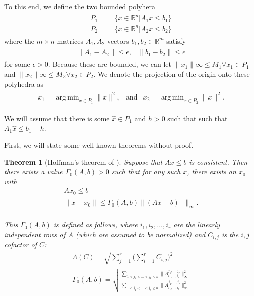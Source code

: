 \documentclass{article}
\newtheorem{theorem}{Theorem}[section]
\theoremstyle{case}
\newcommand{\Rn}{\mathbb R^n}
\newcommand{\Rm}{\mathbb R^m}
\DeclareMathOperator*{\argmin}{arg\,min}
\begin{document}
To this end, we define the two bounded polyhera
\begin{align*}
\begin{array}{ccc}
P_1 &=& \{ x \in \Rn | A_1x\le b_1 \} \\
P_2 &=& \{ x \in \Rn | A_2x\le b_2 \}
\end{array}
\end{align*}
where the $m\times n$ matrices $A_1, A_2$ vectors $b_1, b_2 \in \Rm$  satisfy
\begin{align*}
\begin{array}{cc}
\|A_1 - A_2\| \le \epsilon, & \|b_1 - b_2\| \le \epsilon
\end{array}
\end{align*}
for some $\epsilon > 0$.
Because these are bounded, we can let $\|x_1\|\infty \le M_1 \forall x_1 \in P_1$ and $\|x_2\|\infty \le M_2 \forall x_2 \in P_2$.
We denote the projection of the origin onto these polyhedra as
\begin{align*}
\begin{array}{ccc}
x_1 = \argmin_{x\in P_1}\|x\|^2, &\textrm{and} & x_2 = \argmin_{x\in P_2}\|x\|^2.
\end{array}
\end{align*}

We will assume that there is some $\hat x \in P_1$ and $h > 0$ such that such that $A_1 \hat x \le b_1 - h$.

% 


First, we will state some well known theorems without proof.
\begin{theorem}[Hoffman's theorem of \cite{dummy:hoffman}]
\label{hoffman}
Suppose that $Ax \le b$ is consistent.
Then there exists a value $\Gamma_0(A, b) > 0$ such that for any such $x$, there exists an $x_0$ with
\begin{align*}
Ax_0 \le b \\
\|x - x_0\| \le \Gamma_0(A, b) \|(Ax - b)^+\|_\infty. \\
\end{align*}

This $\Gamma_0(A,b)$ is defined as follows, where $i_1, i_2, \ldots, i_r$ are the linearly independent rows of $A$ (which are assumed to be normalized) and $C_{i,j}$ is the $i,j$ cofactor of $C$:
\begin{align*}
\Lambda(C) = \sqrt{\sum_{j=1}^r\bigg(\sum_{i=1}^r C_{i,j}\bigg)^2} \\
\Gamma_0(A, b) = \sqrt{\frac{\sum_{1 < j_1 < \ldots < j_k \le n} \|\Lambda^{j_1,\ldots,j_r}_{i_1,\ldots, i_r}\|_{\infty}^2}{\sum_{1 < j_1 < \ldots < j_k \le n} \|A^{j_1,\ldots,j_r}_{i_1,\ldots, i_r}\|_{\infty}^2}} \\
\end{align*}
\end{theorem}
\end{document}
